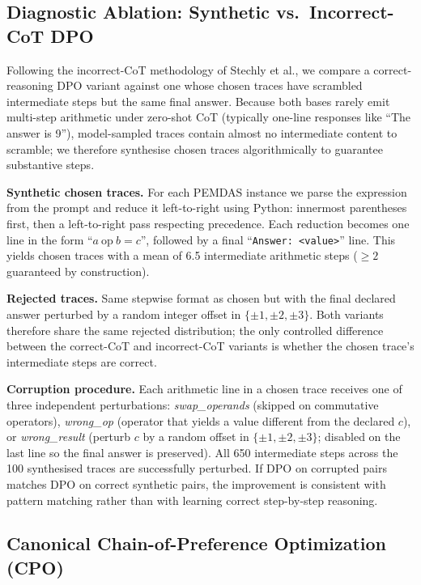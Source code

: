 \documentclass{article}
\begin{document}
\subsection{Diagnostic Ablation: Synthetic vs.\ Incorrect-CoT DPO}

Following the incorrect-CoT methodology of Stechly et al., we compare a correct-reasoning DPO variant against one whose chosen traces have scrambled intermediate steps but the same final answer. Because both bases rarely emit multi-step arithmetic under zero-shot CoT (typically one-line responses like ``The answer is 9''), model-sampled traces contain almost no intermediate content to scramble; we therefore synthesise chosen traces algorithmically to guarantee substantive steps.

\textbf{Synthetic chosen traces.} For each PEMDAS instance we parse the expression from the prompt and reduce it left-to-right using Python: innermost parentheses first, then a left-to-right pass respecting precedence. Each reduction becomes one line in the form ``$a\ \textrm{op}\ b = c$'', followed by a final ``\texttt{Answer: <value>}'' line. This yields chosen traces with a mean of 6.5 intermediate arithmetic steps ($\geq 2$ guaranteed by construction).

\textbf{Rejected traces.} Same stepwise format as chosen but with the final declared answer perturbed by a random integer offset in $\{\pm 1, \pm 2, \pm 3\}$. Both variants therefore share the same rejected distribution; the only controlled difference between the correct-CoT and incorrect-CoT variants is whether the chosen trace's intermediate steps are correct.

\textbf{Corruption procedure.} Each arithmetic line in a chosen trace receives one of three independent perturbations: \emph{swap\_operands} (skipped on commutative operators), \emph{wrong\_op} (operator that yields a value different from the declared $c$), or \emph{wrong\_result} (perturb $c$ by a random offset in $\{\pm 1, \pm 2, \pm 3\}$; disabled on the last line so the final answer is preserved). All 650 intermediate steps across the 100 synthesised traces are successfully perturbed. If DPO on corrupted pairs matches DPO on correct synthetic pairs, the improvement is consistent with pattern matching rather than with learning correct step-by-step reasoning.

\subsection{Canonical Chain-of-Preference Optimization (CPO)}
\label{sec:method-cpo}
\end{document}
